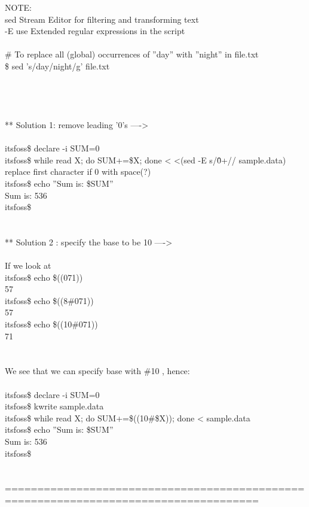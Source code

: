 \documentclass[10pt,a4paper]{article}
\begin{document}
{NOTE:\\
sed  Stream Editor for filtering and transforming text\\
-E  use Extended regular expressions in the script\\
\\
		\# To replace all (global) occurrences of ''day'' with ''night'' in file.txt\\
		\$ sed 's/day/night/g' file.txt\\
		\\
\\
\\
\\
** Solution 1: remove leading '0's  ----> \\
\\
itsfoss\$ declare -i SUM=0\\
itsfoss\$ while read X; do SUM+=\$X; done < <(sed -E s/\^0+// sample.data)		replace first character if 0 with space(?)\\
itsfoss\$ echo ''Sum is: \$SUM''\\
Sum is: 536\\
itsfoss\$ \\
\\
\\
** Solution 2 : specify the base to be 10  ----> \\
\\
If we look at \\
itsfoss\$ echo \$((071))\\
57\\
itsfoss\$ echo \$((8\#071))\\
57\\
itsfoss\$ echo \$((10\#071))\\
71\\
\\
\\
We see that we can specify base with \#10 , hence:\\
\\
itsfoss\$ declare -i SUM=0\\
itsfoss\$ kwrite sample.data \\
itsfoss\$ while read X; do SUM+=\$((10\#\$X)); done < sample.data\\
itsfoss\$ echo ''Sum is: \$SUM''\\
Sum is: 536\\
itsfoss\$ \\
\\
\\
=====================================================================================\\
}
\end{document}
